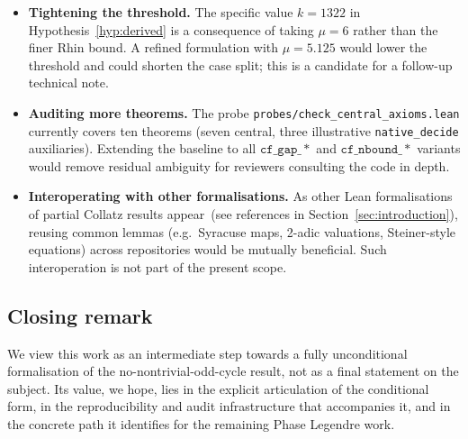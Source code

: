 \begin{itemize}
  \item \textbf{Tightening the threshold.} The specific value \(k = 1322\)
        in Hypothesis~\ref{hyp:derived} is a consequence of taking
        \(\mu = 6\) rather than the finer Rhin bound. A refined
        formulation with \(\mu = 5.125\) would lower the threshold and
        could shorten the case split; this is a candidate for a
        follow-up technical note.
  \item \textbf{Auditing more theorems.} The probe
        \texttt{probes/check\_central\_axioms.lean} currently covers
        ten theorems (seven central, three illustrative
        \texttt{native\_decide} auxiliaries). Extending the baseline to
        all \(\mathtt{cf\_gap\_*}\) and \(\mathtt{cf\_nbound\_*}\)
        variants would remove residual ambiguity for reviewers
        consulting the code in depth.
  \item \textbf{Interoperating with other formalisations.} As other
        Lean formalisations of partial Collatz results
        appear~(see references in Section~\ref{sec:introduction}),
        reusing common lemmas (e.g.\ Syracuse maps, 2-adic valuations,
        Steiner-style equations) across repositories would be mutually
        beneficial. Such interoperation is not part of the present
        scope.
\end{itemize}

\subsection{Closing remark}


We view this work as an intermediate step towards a fully unconditional
formalisation of the no-nontrivial-odd-cycle result, not as a final
statement on the subject. Its value, we hope, lies in the explicit
articulation of the conditional form, in the reproducibility and audit
infrastructure that accompanies it, and in the concrete path it identifies
for the remaining Phase Legendre work.
